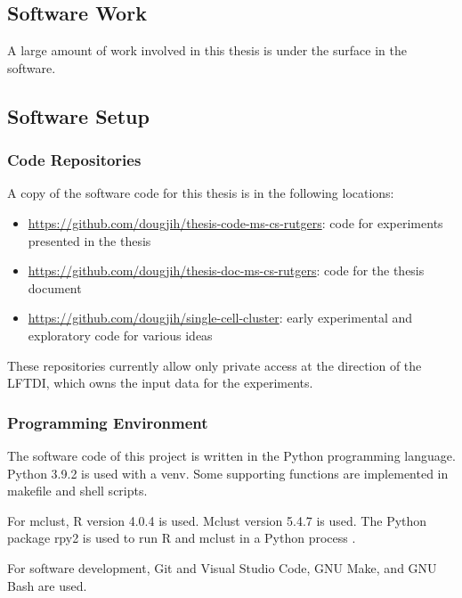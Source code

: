 \begin{theappendices}
\chapter{Software Work}
\thispagestyle{myheadings}
\label{appendix:Software Work}

A large amount of work involved in this thesis is under the surface in the software.

\section{Software Setup}

\subsection{Code Repositories}

A copy of the software code for this thesis is in the following locations:

\begin{itemize}
  \item \url{https://github.com/dougjih/thesis-code-ms-cs-rutgers}: code for experiments presented in the thesis
  \item \url{https://github.com/dougjih/thesis-doc-ms-cs-rutgers}: code for the thesis document
  \item \url{https://github.com/dougjih/single-cell-cluster}: early experimental and exploratory code for various ideas
\end{itemize}

These repositories currently allow only private access at the direction of the LFTDI, which owns the input data for the experiments.

\subsection{Programming Environment}

The software code of this project is written in the Python programming language. Python 3.9.2 is used with a venv. Some supporting functions are implemented in makefile and shell scripts.

For mclust, R version 4.0.4 is used. Mclust version 5.4.7 is used. The Python package rpy2 is used to run R and mclust in a Python process \cite{noauthor_rpy2_nodate}.

For software development, Git and Visual Studio Code, GNU Make, and GNU Bash are used.


\end{theappendices}
